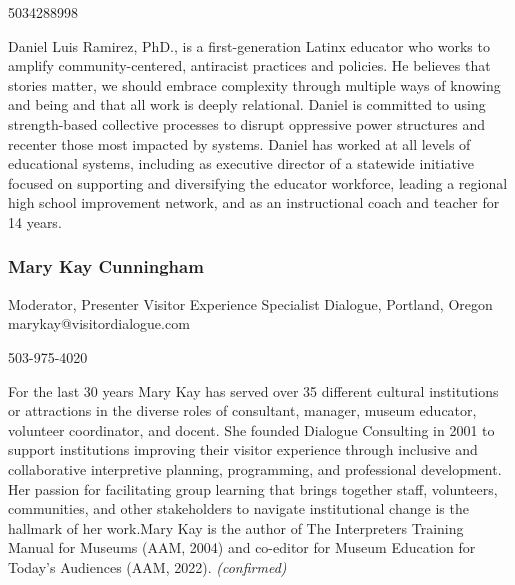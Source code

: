 \documentclass{report}
\begin{document}
              5034288998\newline

              Daniel Luis Ramirez, PhD., is a first-generation Latinx educator who works to amplify community-centered, antiracist practices and policies. He believes that stories matter, we should embrace complexity through multiple ways of knowing and being and that all work is deeply relational. Daniel is committed to using strength-based collective processes to disrupt oppressive power structures and recenter those most impacted by systems. Daniel has worked at all levels of educational systems, including as executive director of a statewide initiative focused on supporting and diversifying the educator workforce, leading a regional high school improvement network, and as an instructional coach and teacher for 14 years.\newline


              
                \subsubsection*{ Mary Kay Cunningham }
                Moderator, Presenter\newline
                Visitor Experience Specialist\newline
                Dialogue, Portland, Oregon
                \newline
                marykay@visitordialogue.com\newline
                
                503-975-4020\newline

                For the last 30 years Mary Kay has served over 35 different cultural institutions or attractions in the diverse roles of consultant, manager, museum educator, volunteer coordinator, and docent. She founded Dialogue Consulting in 2001 to support institutions improving their visitor experience through inclusive and collaborative interpretive planning, programming, and professional development. Her passion for facilitating group learning that brings together staff, volunteers, communities, and other stakeholders to navigate institutional change is the hallmark of her work.Mary Kay is the author of The Interpreters Training Manual for Museums (AAM, 2004) and co-editor for Museum Education for Today’s Audiences (AAM, 2022).\newline
                \emph{ (confirmed) }
              
\end{document}
